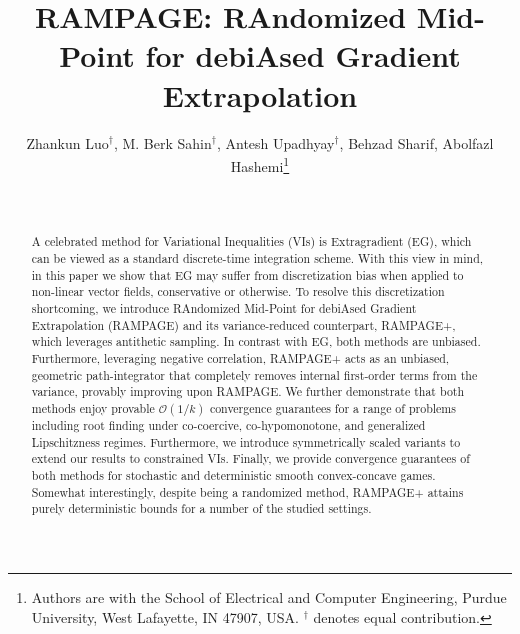 \documentclass[letter,11pt]{article}
\title{\vspace{-10mm}\textbf{RAMPAGE: RAndomized Mid-Point for debiAsed Gradient Extrapolation}}
\date{}
\author{Zhankun Luo$^\dagger$, M. Berk Sahin$^\dagger$, Antesh Upadhyay$^\dagger$, Behzad Sharif, Abolfazl Hashemi\thanks{Authors are with the School of Electrical and Computer Engineering, Purdue University, West Lafayette, IN 47907, USA. $^\dagger$ denotes equal contribution.}}
\begin{document}
\maketitle

\vspace{-5mm}
\begin{abstract}
\vspace{-7mm}
\noindent{
}
\\\\\noindent
A celebrated method for Variational Inequalities (VIs) is Extragradient (EG), which can be viewed as a standard discrete-time integration scheme. With this view in mind, in this paper we show that EG may suffer from discretization bias when applied to non-linear vector fields, conservative or otherwise. To resolve this discretization shortcoming, we introduce RAndomized Mid-Point for debiAsed Gradient Extrapolation (RAMPAGE) and its variance-reduced counterpart, RAMPAGE+, which leverages antithetic sampling. In contrast with EG, both methods are unbiased. Furthermore, leveraging negative correlation, RAMPAGE+ acts as an unbiased, geometric path-integrator that completely removes internal first-order terms from the variance, provably improving upon RAMPAGE. We further demonstrate that both methods enjoy provable $\mathcal{O}(1/k)$ convergence guarantees for a range of problems including root finding under co-coercive, co-hypomonotone, and generalized Lipschitzness regimes. Furthermore, we introduce symmetrically scaled variants to extend our results to constrained VIs. Finally, we provide convergence guarantees of both methods for stochastic and deterministic smooth convex-concave games. Somewhat interestingly, despite being a randomized method, RAMPAGE+ attains purely deterministic bounds for a number of the studied settings.
\end{abstract}
\end{document}

